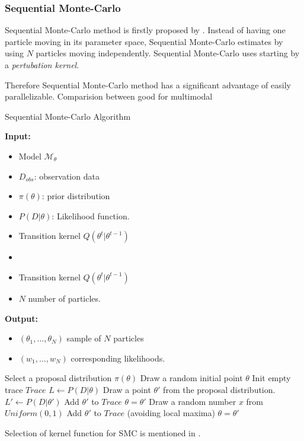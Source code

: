 \subsubsection{Sequential Monte-Carlo}
Sequential Monte-Carlo method is firstly proposed by \cite{del2006sequential}.  Instead of having
one particle moving in its parameter space, Sequential Monte-Carlo estimates by using $N$ particles
moving independently. Sequential Monte-Carlo uses  starting by a \textit{pertubation kernel}.

Therefore Sequential Monte-Carlo method has a significant advantage of easily
parallelizable. Comparision between \cite{daviet2018inference}
good for multimodal
\begin{algorithm}[H]
    \caption{Sequential Monte-Carlo Algorithm}
    \label{alg:smc}
    \hspace*{\algorithmicindent} \textbf{Input:}
    \begin{itemize}
        \item Model $\mathcal{M}_\theta$
        \item $D_{obs}$: observation data
        \item $\pi(\theta)$: prior distribution
        \item $P(D|\theta)$: Likelihood function.
        \item Transition kernel $Q(\theta^t|\theta^{t-1})$
        \item \item Transition kernel $Q(\theta^t|\theta^{t-1})$
        \item $N$ number of particles.
    \end{itemize}
    \hspace*{\algorithmicindent} \textbf{Output:}
    \begin{itemize}
        \item $(\theta_1,\ldots,\theta_N)$ sample of $N$ particles
        \item $(w_1,\ldots,w_N)$ corresponding likelihoods.
    \end{itemize}
    \begin{algorithmic}[1]
        \State Select a proposal distribution $\pi(\theta)$
        \State Draw a random initial point $\theta$
        \State Init empty trace $Trace$
        \State $L \leftarrow P(D|\theta)$
        \State Draw a point $\theta' $ from the proposal distribution.
        \State $L' \leftarrow P(D|\theta')$
        \State Add $\theta'$ to $Trace$
        \State $\theta = \theta'$
        \Else
        \State Draw a random number $x$ from $Uniform(0,1)$
        \State Add $\theta'$ to $Trace$ (avoiding local maxima)
        \State $\theta = \theta'$
        \EndIf
        \EndIf
        \EndWhile
        \EndProcedure
    \end{algorithmic}
\end{algorithm}
Selection of kernel function for SMC is mentioned in \cite{silk2012optimizing}.

